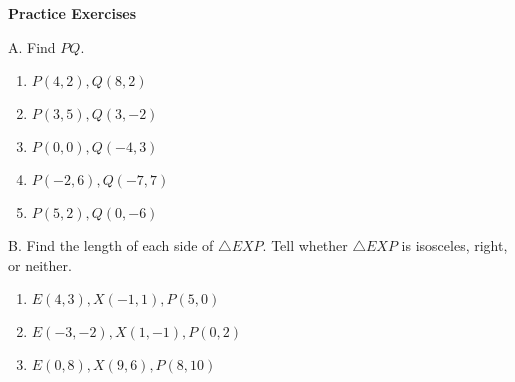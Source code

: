 \textbf{Practice Exercises}

\vspce
A. Find $PQ$. 
\begin{enumerate}[label = \arabic*. ]
\item $P(4, 2), Q(8, 2)$
\item $P(3, 5), Q(3, -2)$
\item $P(0, 0), Q(-4, 3)$
\item $P(-2, 6), Q(-7, 7)$
\item $P(5, 2), Q(0,-6)$
\end{enumerate} 

B. Find the  length  of each side of $\triangle EXP$. Tell whether $\triangle EXP$ is isosceles, right, or neither. 
\begin{enumerate}[label = \arabic*. ]
\item $E(4,3), X(-1,1), P(5,0)$ 
\item $E(-3,-2), X(1,-1), P(0,2)$ 
\item $E(0,8), X(9,6), P(8,10) $

\end{enumerate} 




